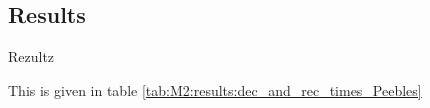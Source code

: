 \subsection{Results}\label{ssec:M2:results}
Rezultz    




This is given in table \ref{tab:M2:results:dec_and_rec_times_Peebles}
